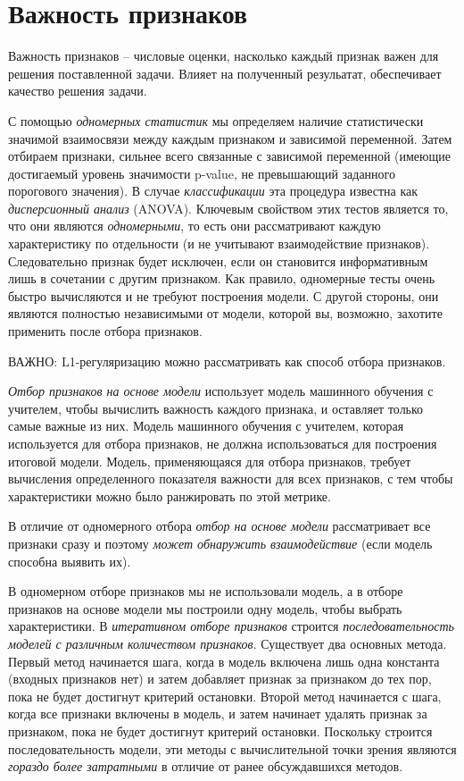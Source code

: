 \documentclass[%
	11pt,
	a4paper,
	utf8,
		]{article}
\begin{document}
\section{Важность признаков}

Важность признаков -- числовые оценки, насколько каждый признак важен для решения поставленной задачи. Влияет на полученный резульатат, обеспечивает качество решения задачи.

С помощью \emph{одномерных статистик} мы определяем наличие статистически значимой взаимосвязи между каждым признаком и зависимой переменной. Затем отбираем признаки, сильнее всего связанные с зависимой переменной (имеющие достигаемый уровень значимости p-value, не превышающий заданного порогового значения). В случае \emph{классификации} эта процедура известна как \emph{дисперсионный анализ} (ANOVA). Ключевым свойством этих тестов является то, что они являются \emph{одномерными}, то есть они рассматривают каждую характеристику по отдельности (и не учитывают взаимодействие признаков). Следовательно признак будет исключен, если он становится информативным лишь в сочетании с другим признаком. Как правило, одномерные тесты очень быстро вычисляются и не требуют построения модели. С другой стороны, они являются полностью независимыми от модели, которой вы, возможно, захотите применить после отбора признаков.

ВАЖНО: L1-регуляризацию можно рассматривать как способ отбора признаков.

\emph{Отбор признаков на основе модели} использует модель машинного обучения с учителем, чтобы вычислить важность каждого признака, и оставляет только самые важные из них. Модель машинного обучения с учителем, которая используется для отбора признаков, не должна использоваться для построения итоговой модели. Модель, применяющаяся для отбора признаков, требует вычисления определенного показателя важности для всех признаков, с тем чтобы характеристики можно было ранжировать по этой метрике.

В отличие от одномерного отбора \emph{отбор на основе модели} рассматривает все признаки сразу и поэтому \emph{может обнаружить взаимодействие} (если модель способна выявить их).

В одномерном отборе признаков мы не использовали модель, а в отборе признаков на основе модели мы построили одну модель, чтобы выбрать характеристики. В \emph{итеративном отборе признаков} строится \emph{последовательность моделей с различным количеством признаков}. Существует два основных метода. Первый метод начинается шага, когда в модель включена лишь одна константа (входных признаков нет) и затем добавляет признак за признаком до тех пор, пока не будет достигнут критерий остановки. Второй метод начинается с шага, когда все признаки включены в модель, и затем начинает удалять признак за признаком, пока не будет достигнут критерий остановки. Поскольку строится последовательность модели, эти методы с вычислительной точки зрения являются \emph{гораздо более затратными} в отличие от ранее обсуждавшихся методов.
\end{document}
